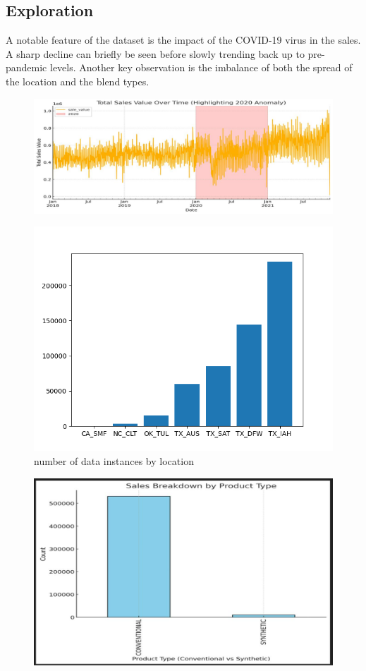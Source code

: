 \documentclass{article}
\begin{document}
    \subsection{Exploration}
        A notable feature of the dataset is the impact of the COVID-19 virus in the sales. A sharp
        decline can briefly be seen before slowly trending back up to pre-pandemic levels.
        Another key observation is the imbalance of both the spread of the location and the blend types.
        \begin{figure}[!h]
            \centering
            \includegraphics[width=0.9\linewidth]{assets/covid.jpg}
            \label{fig:covid}
        \end{figure}
        \begin{figure}[H]
            \centering
            \includegraphics[width=0.8\linewidth]{assets/locations.png}
            \caption{number of data instances by location}
            \label{fig:locations}
        \end{figure}
        \begin{figure}[H]
            \centering
            \includegraphics[width=0.6\linewidth]{assets/blend.jpg}
            \label{fig:blend}
        \end{figure}
        
\end{document}
